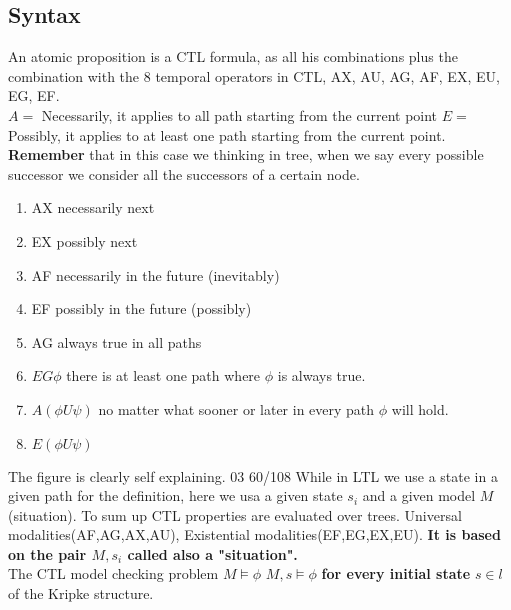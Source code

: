 \documentclass[11pt]{article}
\begin{document}
\subsection{Syntax} %
\label{sub:syntax}
An atomic proposition is a CTL formula, as all his combinations plus the combination with the 8 temporal operators in CTL, AX, AU, AG, AF, EX, EU, EG, EF.\\
$A = $ Necessarily, it applies to all path starting from the current point
$E = $ Possibly, it applies to at least one path starting from the current point.
\textbf{Remember} that in this case we thinking in tree, when we say every possible successor we consider all the successors of a certain node.
\begin{enumerate}
	\item AX necessarily next
	\item EX possibly next
	\item AF necessarily in the future (inevitably)
	\item EF possibly in the future (possibly)
	\item AG always true  in all paths
	\item $EG\phi$ there is at least one path where $\phi$ is always true.
	\item $A(\phi U \psi)$ no matter what sooner or later in every path $\phi$ will hold.
	\item $E(\phi U \psi)$ 
\end{enumerate}
The figure is clearly self explaining. 03 60/108 
While in LTL we use a state in a given path for the definition, here we usa a given state $s_i$ and a given model $M$ (situation).
To sum up CTL properties are evaluated over trees. Universal modalities(AF,AG,AX,AU), Existential modalities(EF,EG,EX,EU).
\textbf{It is based on the pair $M,s_i$ called also a "situation".}\\
The CTL model checking problem $M \models  \phi$
$M,s \models \phi$ \textbf{for every initial state} $s \in l$ of the Kripke structure.
\end{document}
